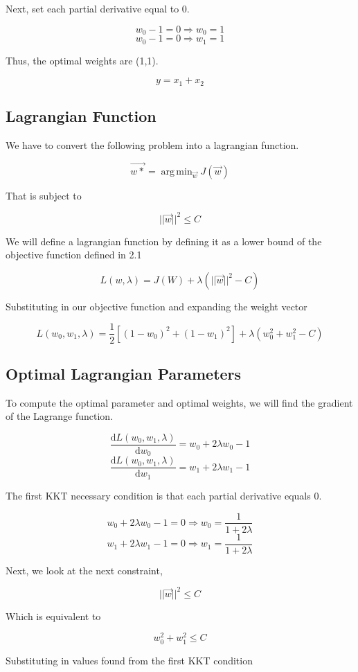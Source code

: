 \documentclass{article}
\DeclareMathOperator*{\argminA}{arg\,min}
\begin{document}
Next, set each partial derivative equal to 0.

\[w_0 - 1 = 0 \Rightarrow w_0 = 1\]
\[w_0 - 1 = 0 \Rightarrow w_1 = 1\]

Thus, the optimal weights are (1,1).

\[y = x_1 + x_2\]

\subsection{Lagrangian Function}

We have to convert the following problem into a lagrangian function.

\[\Vec{w*} = \argminA_{\Vec{w}} J(\Vec{w})\]

That is subject to

\[||\Vec{w}||^2 \leq C\]

We will define a lagrangian function by defining it as a lower bound of the objective function defined in 2.1

\[L(w, \lambda) = J(W) + \lambda( ||\Vec{w}||^2 - C )\]

Substituting in our objective function and expanding the weight vector

\[L(w_0, w_1, \lambda) = \frac{1}{2} [(1 - w_0)^2 + (1 - w_1)^2]  + \lambda( w_0^2 + w_1^2 - C )\]

\subsection{Optimal Lagrangian Parameters}
To compute the optimal parameter and optimal weights, we will find the gradient of the Lagrange function.

\[\frac{\mathrm{d}L(w_0, w_1, \lambda)}{\mathrm{d}w_0} = w_0 + 2\lambda w_0 - 1 \]
\[\frac{\mathrm{d}L(w_0, w_1, \lambda)}{\mathrm{d}w_1} = w_1 + 2\lambda w_1 - 1 \]

The first KKT necessary condition is that each partial derivative equals 0.

\[w_0 + 2\lambda w_0 - 1 = 0 \Rightarrow w_0 = \frac{1}{1+2\lambda}\]
\[w_1 + 2\lambda w_1 - 1 = 0 \Rightarrow w_1 = \frac{1}{1+2\lambda}\]

Next, we look at the next constraint,

\[||\Vec{w}||^2 \leq C\] 

Which is equivalent to 

\[w_0^2 + w_1^2 \leq C\] 

Substituting in values found from the first KKT condition
\end{document}
